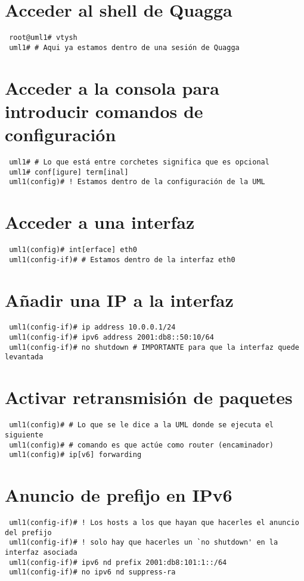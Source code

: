 \documentclass{article}
\begin{document}
\section{Acceder al shell de Quagga}
\begin{verbatim}
 root@uml1# vtysh
 uml1# # Aqui ya estamos dentro de una sesión de Quagga
\end{verbatim}

\section{Acceder a la consola para introducir comandos de configuración}
\begin{verbatim}
 uml1# # Lo que está entre corchetes significa que es opcional
 uml1# conf[igure] term[inal]
 uml1(config)# ! Estamos dentro de la configuración de la UML
\end{verbatim}

\section{Acceder a una interfaz}
\begin{verbatim}
 uml1(config)# int[erface] eth0
 uml1(config-if)# # Estamos dentro de la interfaz eth0
\end{verbatim}

\section{Añadir una IP a la interfaz}
\begin{verbatim}
 uml1(config-if)# ip address 10.0.0.1/24
 uml1(config-if)# ipv6 address 2001:db8::50:10/64
 uml1(config-if)# no shutdown # IMPORTANTE para que la interfaz quede levantada
\end{verbatim}

\section{Activar retransmisión de paquetes}
\begin{verbatim}
 uml1(config)# # Lo que se le dice a la UML donde se ejecuta el siguiente
 uml1(config)# # comando es que actúe como router (encaminador)
 uml1(config)# ip[v6] forwarding
\end{verbatim}

\section{Anuncio de prefijo en IPv6}
\begin{verbatim}
 uml1(config-if)# ! Los hosts a los que hayan que hacerles el anuncio del prefijo
 uml1(config-if)# ! solo hay que hacerles un `no shutdown' en la interfaz asociada
 uml1(config-if)# ipv6 nd prefix 2001:db8:101:1::/64
 uml1(config-if)# no ipv6 nd suppress-ra
\end{verbatim}
\end{document}
